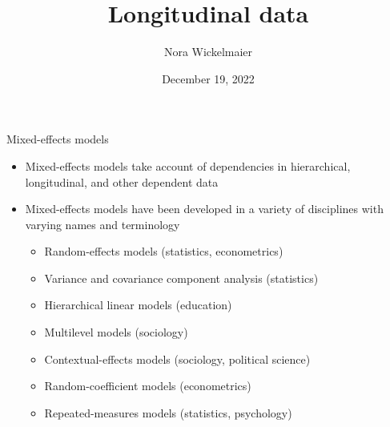 \documentclass[aspectratio=169]{beamer}
\title{Longitudinal data}
\author{Nora Wickelmaier}
\date{December 19, 2022}
\begin{document}
\begin{frame}{}
\thispagestyle{empty}
\titlepage
\end{frame}



\begin{frame}{Mixed-effects models}
\begin{itemize}
  \item Mixed-effects models take account of dependencies in hierarchical,
    longitudinal, and other dependent data
  \item Mixed-effects models have been developed in a variety of
    disciplines with varying names and terminology
  \begin{itemize}
    \item Random-effects models (statistics, econometrics)
    \item Variance and covariance component analysis (statistics)
    \item Hierarchical linear models (education)
    \item Multilevel models (sociology)
    \item Contextual-effects models (sociology, political science)
    \item Random-coefficient models (econometrics)
    \item Repeated-measures models (statistics, psychology)
  \end{itemize}
\end{itemize}
  \begin{flushright}{\footnotesize \citet{Fox2016}}\end{flushright}
\end{frame}


% 
% 
\end{document}
